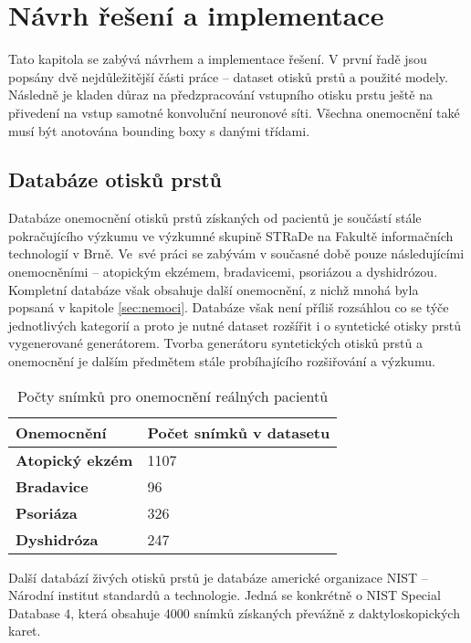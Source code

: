\chapter{Návrh řešení a implementace}
Tato kapitola se zabývá návrhem a implementace řešení. V první řadě jsou popsány dvě nejdůležitější části práce -- dataset otisků prstů a použité modely. Následně je kladen důraz na předzpracování vstupního otisku prstu ještě na přivedení na vstup samotné konvoluční neuronové síti. Všechna onemocnění také musí být anotována bounding boxy s danými třídami.
\section{Databáze otisků prstů}
Databáze onemocnění otisků prstů získaných od pacientů je součástí stále pokračujícího výzkumu ve výzkumné skupině STRaDe na Fakultě informačních technologií v Brně. Ve~své práci se zabývám v současné době pouze následujícími onemocněními -- atopickým ekzémem, bradavicemi, psoriázou a dyshidrózou. Kompletní databáze však obsahuje další onemocnění, z nichž mnohá byla popsaná v kapitole \ref{sec:nemoci}. Databáze však není příliš rozsáhlou co se týče jednotlivých kategorií a proto je nutné dataset rozšířit i o syntetické otisky prstů vygenerované generátorem. Tvorba generátoru syntetických otisků prstů a onemocnění je dalším předmětem stále probíhajícího rozšiřování a výzkumu.

\begin{table}[!htbp]
\centering
\begin{tabular}{|l|l|}
\hline
\textbf{Onemocnění}     & \textbf{Počet snímků v datasetu} \\ \hline
\textbf{Atopický ekzém} & 1107                             \\ \hline
\textbf{Bradavice}      & 96                               \\ \hline
\textbf{Psoriáza}       & 326                              \\ \hline
\textbf{Dyshidróza}     & 247                              \\ \hline
\end{tabular}
\caption{Počty snímků pro onemocnění reálných pacientů}
\end{table}

Další databází živých otisků prstů je databáze americké organizace NIST -- Národní institut standardů a technologie. Jedná se konkrétně o NIST Special Database 4, která obsahuje 4000 snímků získaných převážně z daktyloskopických karet.

